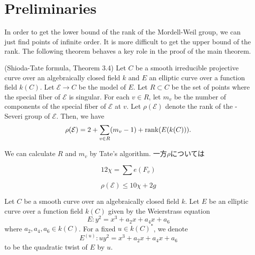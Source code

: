 \documentclass[main]{subfiles}
\begin{document}
\chapter{Preliminaries}

In order to get the lower bound of the rank of the Mordell-Weil group, we can just find points of infinite order.
It is more difficult to get the upper bound of the rank.
The following theorem behaves a key role in the proof of the main theorem.
\begin{thm}{(Shioda-Tate formula, \cite{ref:naskrecki2013} Theorem 3.4)}
    \label{thm:shioda}
    Let $C$ be a smooth irreducible projective curve over an algebraically closed field $k$ and $E$ an elliptic curve over a function field $k(C)$.
    Let $\mathcal{E} \to C$ be the \Neron{} model of $E$.
    Let $R \subset C$ be the set of points where the special fiber of $\mathcal{E}$ is singular.
    For each $v \in R$, let $m_{v}$ be the number of components of the special fiber of $\mathcal{E}$ at $v$.
    Let $\rho(\mathcal{E})$ denote the rank of the \Neron-Severi group of $\mathcal{E}$.
    Then, we have
    \begin{equation}
        \rho (\mathcal{E}) = 2 + \sum_{v \in R} (m_{v} - 1) + \operatorname{rank}(E(k(C))).
    \end{equation}
\end{thm}

We can calculate $R$ and $m_{v}$ by Tate's algorithm.
一方$\rho$については

\begin{equation}
    12 \chi = \sum e(F_{v})
\end{equation}

\begin{thm}
    \label{thm:rho}
    \begin{equation}
        \rho(\mathcal{E}) \leq 10 \chi + 2g
    \end{equation}
\end{thm}

\begin{dfn}
    Let $C$ be a smooth curve over an algebraically closed field $k$.
    Let $E$ be an elliptic curve over a function field $k(C)$ given by the Weierstrass equation
    \begin{equation}
        E: y^{2} = x^{3} + a_{2} x + a_{4} x + a_{6}
    \end{equation}
    where $a_{2}, a_{4}, a_{6} \in k(C)$.
    For a fixed $u \in k(C)^*$, we denote
    \begin{equation}
        E^{(u)}: u y^{2} = x^{3} + a_{2} x + a_{4} x + a_{6}
    \end{equation}
    to be the quadratic twist of $E$ by $u$.
\end{dfn}
\end{document}
